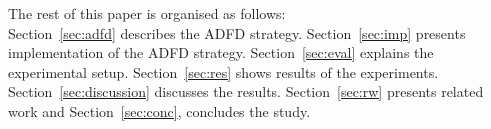\documentclass{acm_proc_article-sp}
\begin{document}

The rest of this paper is organised as follows: \\ Section~\ref{sec:adfd} describes the ADFD strategy. Section~\ref{sec:imp} presents implementation of the ADFD strategy. Section~\ref{sec:eval} explains the experimental setup. Section~\ref{sec:res} shows results of the experiments. Section~\ref{sec:discussion} discusses the results. Section~\ref{sec:rw} presents related work and Section~\ref{sec:conc}, concludes the study.


\end{document}
